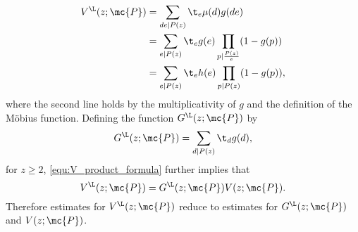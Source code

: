     \begin{align*}
      V^{\L}(z;\mc{P}) &= \sum_{de \mid P(z)}\t_{e}\mu(d)g(de) \\
      &= \sum_{e \mid P(z)}\t_{e}g(e)\prod_{p \mid \frac{P(z)}{e}}(1-g(p)) \\
      &= \sum_{e \mid P(z)}\t_{e}h(e)\prod_{p \mid P(z)}(1-g(p)),
    \end{align*}
    where the second line holds by the multiplicativity of $g$ and the definition of the M\"obius function. Defining the function $G^{\L}(z;\mc{P})$ by
    \[
      G^{\L}(z;\mc{P}) = \sum_{d \mid P(z)}\t_{d}g(d),
    \]
    for $z \ge 2$, \cref{equ:V_product_formula} further implies that
    \[
      V^{\L}(z;\mc{P}) = G^{\L}(z;\mc{P})V(z;\mc{P}).
    \]
    Therefore estimates for $V^{\L}(z;\mc{P})$ reduce to estimates for $G^{\L}(z;\mc{P})$ and $V(z;\mc{P})$.